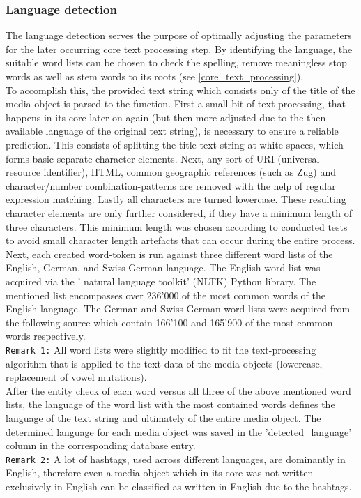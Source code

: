 \subsubsection{Language detection} \label{langauge_detection}
The language detection serves the purpose of optimally adjusting the parameters for the later occurring core text processing step. By identifying the language, the suitable word lists can be chosen to check the spelling, remove meaningless stop words as well as stem words to its roots (see \ref{core_text_processing}).\\
\newline
To accomplish this, the provided text string which consists only of the title of the media object is parsed to the function. First a small bit of text processing, that happens in its core later on again (but then more adjusted due to the then available language of the original text string), is necessary to ensure a reliable prediction. This consists of splitting the title text string at white spaces, which forms basic separate character elements. Next, any sort of URI (universal resource identifier), HTML, common geographic references (such as Zug) and character/number combination-patterns are removed with the help of regular expression matching. Lastly all characters are turned lowercase. These resulting character elements are only further considered, if they have a minimum length of three characters. This minimum length was chosen according to conducted tests to avoid small character length artefacts that can occur during the entire process.\\
Next, each created word-token is run against three different word lists of the English, German, and Swiss German language.
The English word list was acquired via the ' natural language toolkit' (NLTK) Python library. The mentioned list encompasses over 236'000 of the most common words of the English language.
The German and Swiss-German word lists were acquired from the following source \parencite{Geooffwicks} which contain 166'100 and 165'900  of the most common words respectively.\\
\newline
\texttt{Remark 1:} All word lists were slightly modified to fit the text-processing algorithm that is applied to the text-data of the media objects (lowercase, replacement of vowel mutations).\\
\newline
After the entity check of each word versus all three of the above mentioned word lists, the language of the word list with the most contained words defines the language of the text string and ultimately of the entire media object. The determined language for each media object was saved in the 'detected\_language' column in the corresponding database entry.\\
\newline
\texttt{Remark 2:} A lot of hashtags, used across different languages, are dominantly in English, therefore even a media object which in its core was not written exclusively in English can be classified as written in English due to the hashtags.

